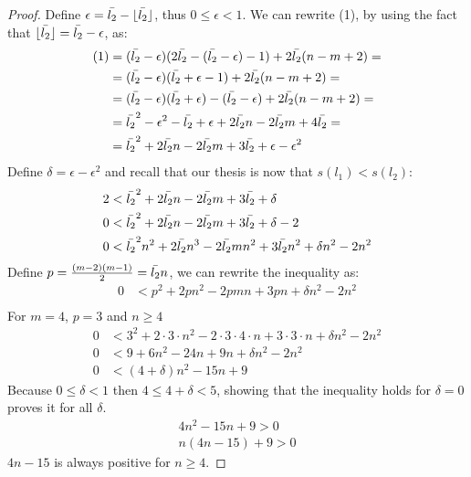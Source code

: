 \documentclass[version=3.21, pagesize, twoside=off, bibliography=totoc, DIV=calc, fontsize=12pt, a4paper]{scrartcl}
\begin{document}
\begin{proof}
	Define $\epsilon = \bar{l_2} - \lfloor\bar{l_2}\rfloor$, thus $0 ≤ \epsilon < 1$. We can rewrite (1), by using the fact that $\lfloor\bar{l_2}\rfloor = \bar{l_2} - \epsilon$, as:
	\begin{align}
		(1)&= (\bar{l_2}-\epsilon)(2\bar{l_2}-(\bar{l_2}-\epsilon)-1)+2\bar{l_2}(n-m+2)=\\
		&= (\bar{l_2}-\epsilon)(\bar{l_2}+\epsilon-1)+2\bar{l_2}(n-m+2)=\\
		&= (\bar{l_2}-\epsilon)(\bar{l_2}+\epsilon)-(\bar{l_2}-\epsilon)+2\bar{l_2}(n-m+2)=\\
		&= \bar{l_2}^2-\epsilon^2-\bar{l_2}+\epsilon+2\bar{l_2} n-2\bar{l_2} m+4\bar{l_2}=\\
		&= \bar{l_2}^2+2\bar{l_2} n-2\bar{l_2} m+3\bar{l_2}+\epsilon-\epsilon^2\\
	\end{align}
	\hfuzz=4cm
	Define $\delta=\epsilon-\epsilon^2$ and recall that our thesis is now that $s(l_1)<s(l_2)$:
	\begin{align}
		2&< \bar{l_2}^2+2\bar{l_2} n-2\bar{l_2} m+3\bar{l_2}+\delta\\
		0&< \bar{l_2}^2+2\bar{l_2} n-2\bar{l_2} m+3\bar{l_2}+\delta-2\\
		0&< \bar{l_2}^2 n^2+2\bar{l_2} n^3-2\bar{l_2} m n^2+3\bar{l_2} n^2+\delta n^2-2 n^2\\
	\end{align}
	Define $p=\frac{(m-2)(m-1)}{2}=\bar{l_2} n$, we can rewrite the inequality as: 
	\begin{align}
		0&< p^2+2p n^2-2p m n+3p n+\delta n^2-2 n^2\\
	\end{align}
	For $m=4$, $p=3$ and $n\geq4$
	\begin{align}
		0&< 3^2+2 \cdot 3 \cdot n^2-2 \cdot 3 \cdot 4 \cdot n+3 \cdot 3 \cdot n+\delta n^2-2 n^2\\
		0&< 9+6 n^2-24 n+9n+ \delta n^2-2 n^2 \\
		0&<(4+\delta)n^2-15n+9
	\end{align}
	Because $0 \leq \delta < 1$ then $4 \leq 4+\delta < 5$, showing that the inequality holds for $\delta=0$  proves it for all $\delta$.
	\begin{align}
		4n^2-15n+9>0 \\
		n(4n-15)+9>0 
	\end{align}
	$4n-15$ is always positive for $n\geq4$. 
	

\end{proof}
\end{document}

